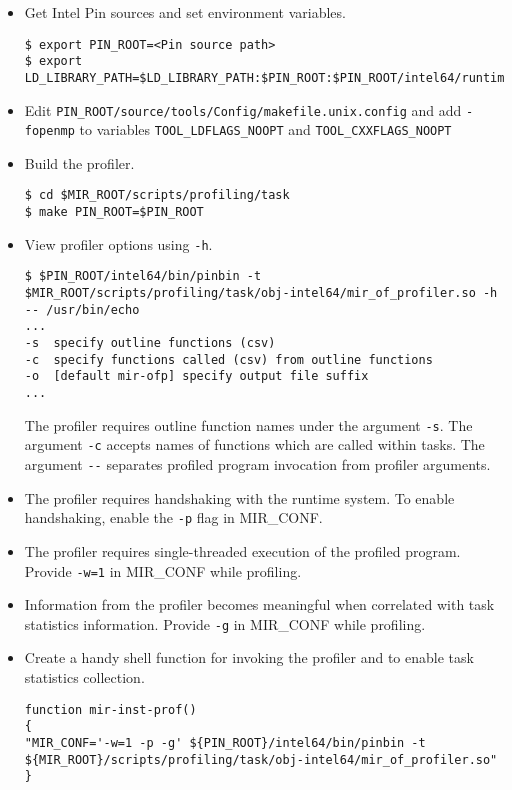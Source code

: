 \documentclass[11pt,a4paper]{article}
\begin{document}
\begin{itemize}
\item Get Intel Pin sources and set environment variables.

\begin{lstlisting}[style=MyInputStyle]
$ export PIN_ROOT=<Pin source path>
$ export LD_LIBRARY_PATH=$LD_LIBRARY_PATH:$PIN_ROOT:$PIN_ROOT/intel64/runtime
\end{lstlisting}

\item Edit \lstinline!PIN_ROOT/source/tools/Config/makefile.unix.config! and add \lstinline!-fopenmp! to variables \lstinline!TOOL_LDFLAGS_NOOPT!  and \lstinline!TOOL_CXXFLAGS_NOOPT!

\item Build the profiler.

\begin{lstlisting}[style=MyInputStyle]
$ cd $MIR_ROOT/scripts/profiling/task
$ make PIN_ROOT=$PIN_ROOT
\end{lstlisting}

\item View profiler options using \lstinline!-h!.

\begin{lstlisting}[style=MyInputStyle]
$ $PIN_ROOT/intel64/bin/pinbin -t $MIR_ROOT/scripts/profiling/task/obj-intel64/mir_of_profiler.so -h -- /usr/bin/echo
...
-s  specify outline functions (csv)
-c  specify functions called (csv) from outline functions
-o  [default mir-ofp] specify output file suffix
...
\end{lstlisting}

The profiler requires outline function names under the argument \lstinline!-s!. The argument \lstinline!-c! accepts names of functions which are called within tasks. The argument \lstinline!--! separates profiled program invocation from profiler arguments.

\item The profiler requires handshaking with the runtime system. To enable handshaking, enable the \lstinline!-p! flag in MIR\_CONF.

\item The profiler requires single-threaded execution of the profiled program. Provide \lstinline!-w=1! in MIR\_CONF while profiling.

\item Information from the profiler becomes meaningful when correlated with task statistics information. Provide \lstinline!-g! in MIR\_CONF while profiling.

\item Create a handy shell function for invoking the profiler and to enable task statistics collection.
  
\begin{lstlisting}[style=MyInputStyle]
function mir-inst-prof()
{
"MIR_CONF='-w=1 -p -g' ${PIN_ROOT}/intel64/bin/pinbin -t ${MIR_ROOT}/scripts/profiling/task/obj-intel64/mir_of_profiler.so"
}
\end{lstlisting}
\end{itemize}
\end{document}
